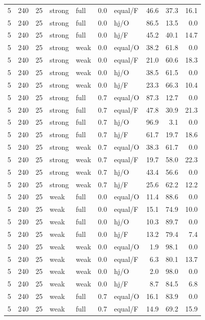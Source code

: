 {\begin{longtable}{@{}rrrllllrrr@{}}
5 & 240 & 25 & strong & full & 0.0 & equal/F & 46.6 & 37.3 & 16.1\\
5 & 240 & 25 & strong & full & 0.0 & hj/O & 86.5 & 13.5 & 0.0\\
5 & 240 & 25 & strong & full & 0.0 & hj/F & 45.2 & 40.1 & 14.7\\
5 & 240 & 25 & strong & weak & 0.0 & equal/O & 38.2 & 61.8 & 0.0\\
5 & 240 & 25 & strong & weak & 0.0 & equal/F & 21.0 & 60.6 & 18.3\\
5 & 240 & 25 & strong & weak & 0.0 & hj/O & 38.5 & 61.5 & 0.0\\
5 & 240 & 25 & strong & weak & 0.0 & hj/F & 23.3 & 66.3 & 10.4\\
5 & 240 & 25 & strong & full & 0.7 & equal/O & 87.3 & 12.7 & 0.0\\
5 & 240 & 25 & strong & full & 0.7 & equal/F & 47.8 & 30.9 & 21.3\\
5 & 240 & 25 & strong & full & 0.7 & hj/O & 96.9 & 3.1 & 0.0\\
5 & 240 & 25 & strong & full & 0.7 & hj/F & 61.7 & 19.7 & 18.6\\
5 & 240 & 25 & strong & weak & 0.7 & equal/O & 38.3 & 61.7 & 0.0\\
5 & 240 & 25 & strong & weak & 0.7 & equal/F & 19.7 & 58.0 & 22.3\\
5 & 240 & 25 & strong & weak & 0.7 & hj/O & 43.4 & 56.6 & 0.0\\
5 & 240 & 25 & strong & weak & 0.7 & hj/F & 25.6 & 62.2 & 12.2\\
5 & 240 & 25 & weak & full & 0.0 & equal/O & 11.4 & 88.6 & 0.0\\
5 & 240 & 25 & weak & full & 0.0 & equal/F & 15.1 & 74.9 & 10.0\\
5 & 240 & 25 & weak & full & 0.0 & hj/O & 10.3 & 89.7 & 0.0\\
5 & 240 & 25 & weak & full & 0.0 & hj/F & 13.2 & 79.4 & 7.4\\
5 & 240 & 25 & weak & weak & 0.0 & equal/O & 1.9 & 98.1 & 0.0\\
5 & 240 & 25 & weak & weak & 0.0 & equal/F & 6.3 & 80.1 & 13.7\\
5 & 240 & 25 & weak & weak & 0.0 & hj/O & 2.0 & 98.0 & 0.0\\
5 & 240 & 25 & weak & weak & 0.0 & hj/F & 8.7 & 84.5 & 6.8\\
5 & 240 & 25 & weak & full & 0.7 & equal/O & 16.1 & 83.9 & 0.0\\
5 & 240 & 25 & weak & full & 0.7 & equal/F & 14.9 & 69.2 & 15.9\\

\end{longtable}}
